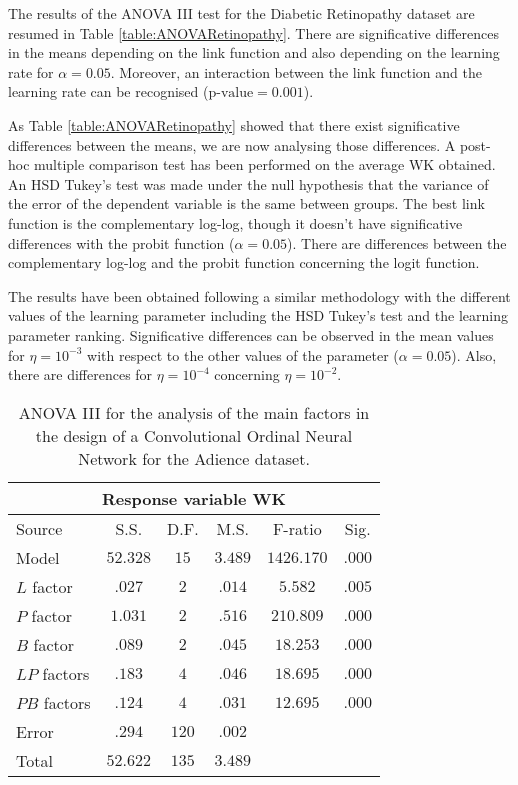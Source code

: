 \documentclass[10pt, a4paper, titlepage, twocolumn]{article}
\begin{document}
	The results of the ANOVA III test for the Diabetic Retinopathy dataset are resumed in Table \ref{table:ANOVARetinopathy}. There are significative differences in the means depending on the link function and also depending on the learning rate for $\alpha=0.05$. Moreover, an interaction between the link function and the learning rate can be recognised ($\text{p-value} = 0.001$).
	
	As Table \ref{table:ANOVARetinopathy} showed that there exist significative differences between the means, we are now analysing those differences. A post-hoc multiple comparison test has been performed on the average WK obtained. An HSD Tukey's test was made under the null hypothesis that the variance of the error of the dependent variable is the same between groups. The best link function is the complementary log-log, though it doesn't have significative differences with the probit function ($\alpha=0.05$). There are differences between the complementary log-log and the probit function concerning the logit function.
	
	The results have been obtained following a similar methodology with the different values of the learning parameter including the HSD Tukey's test and the learning parameter ranking. Significative differences can be observed in the mean values for $\eta = 10^{-3}$ with respect to the other values of the parameter ($\alpha=0.05$). Also, there are differences for $\eta = 10^{-4}$ concerning $\eta = 10^{-2}$.
	
	\begin{table}[ht]
		\centering
		\small
		\begin{tabular}{l|ccccc}
			\multicolumn{6}{c}{Response variable WK}\\\hline
			Source & S.S. & D.F. & M.S. & F-ratio & Sig.\\\hline
			Model & $52.328$ & $15$ & $3.489$ & $1426.170$ & $.000$\\
			$L$ factor & $.027$ & $2$ & $.014$ & $5.582$ & $.005$\\
			$P$ factor & $1.031$ & $2$ & $.516$ & $210.809$ & $.000$\\
			$B$ factor & $.089$ & $2$ & $.045$ & $18.253$ & $.000$\\
			$LP$ factors & $.183$ & $4$ & $.046$ & $18.695$ & $.000$\\
			$PB$ factors & $.124$ & $4$ & $.031$ & $12.695$ & $.000$\\
			Error & $.294$ & $120$ & $.002$ & & \\
			Total & $52.622$ & $135$ & $3.489$ & & 
		\end{tabular}
		\caption{ANOVA III for the analysis of the main factors in the design of a Convolutional Ordinal Neural Network for the Adience dataset.}
		\label{table:ANOVAAdience}
	\end{table}
	
\end{document}
